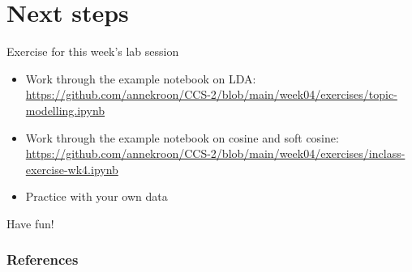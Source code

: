 \documentclass[handout]{beamer}
\begin{document}
\section{Next steps}

\begin{frame}[plain]
	
	\begin{block}{Exercise for this week's lab session}
		\footnotesize
		\begin{itemize}
			\item Work through the example notebook on LDA: \url{https://github.com/annekroon/CCS-2/blob/main/week04/exercises/topic-modelling.ipynb}
			\item Work through the example notebook on cosine and soft cosine: \url{https://github.com/annekroon/CCS-2/blob/main/week04/exercises/inclass-exercise-wk4.ipynb}
			\item Practice with your own data
		\end{itemize}
	\end{block}
	
\end{frame}

\begin{frame}[standout]
Have fun!
\end{frame}

\begin{frame}[t,allowframebreaks]
	\frametitle{References}
	\printbibliography
\end{frame}
\end{document}
